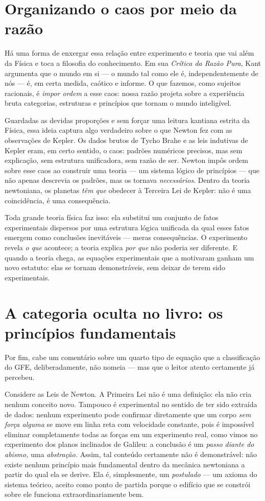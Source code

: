 \section*{Organizando o caos por meio da razão}

Há uma forma de enxergar essa relação entre experimento e teoria que vai
além da Física e toca a filosofia do conhecimento. Em sua
\textit{Crítica da Razão Pura}, Kant argumenta que o mundo em si --- o
mundo tal como ele é, independentemente de nós --- é, em certa medida,
caótico e informe. O que fazemos, como sujeitos racionais, é
\textit{impor ordem} a esse caos: nossa razão projeta sobre a
experiência bruta categorias, estruturas e princípios que tornam o mundo
inteligível.

Guardadas as devidas proporções e sem forçar uma leitura kantiana
estrita da Física, essa ideia captura algo verdadeiro sobre o que Newton
fez com as observações de Kepler. Os dados brutos de Tycho Brahe e as leis
indutivas de Kepler eram, em certo sentido, o caos: padrões numéricos
precisos, mas sem explicação, sem estrutura unificadora, sem razão de
ser. Newton impôs ordem sobre esse caos ao construir uma teoria --- um
sistema lógico de princípios --- que não apenas descrevia os padrões, mas os
tornava \textit{necessários}. Dentro da teoria newtoniana, os planetas
\textit{têm que} obedecer à Terceira Lei de Kepler: não é uma
coincidência, é uma consequência.

Toda grande teoria física faz isso: ela substitui um conjunto de fatos
experimentais dispersos por uma estrutura lógica unificada da qual esses
fatos emergem como conclusões inevitáveis --- meras consequências. O experimento revela
\textit{o que} acontece; a teoria explica \textit{por que} não poderia
ser diferente. E quando a teoria chega, as equações experimentais que a
motivaram ganham um novo estatuto: elas se tornam demonstráveis, sem
deixar de terem sido experimentais.


\section*{A categoria oculta no livro: os princípios fundamentais}

Por fim, cabe um comentário sobre um quarto tipo de equação que a classificação do GFE, deliberadamente, não nomeia --- mas que o leitor atento certamente já percebeu.

Considere as Leis de Newton. A Primeira Lei não é uma definição: ela não
cria nenhum conceito novo. Tampouco é experimental no sentido de ter
sido extraída de dados: nenhum experimento pode confirmar diretamente
que um corpo \textit{sem força alguma} se move em linha reta com
velocidade constante, pois é impossível eliminar completamente todas as
forças em um experimento real, como vimos no experimento dos planos inclinados de Galileu: a conclusão é um \emph{passo diante do abismo,} uma \emph{abstração.} Assim, tal conteúdo certamente não é demonstrável: não existe nenhum princípio mais fundamental dentro da mecânica newtoniana a partir
do qual ela se derive. Ela é, simplesmente, um \textit{postulado} --- um
axioma do sistema teórico, aceito como ponto de partida porque o
edifício que se constrói sobre ele funciona extraordinariamente bem.

